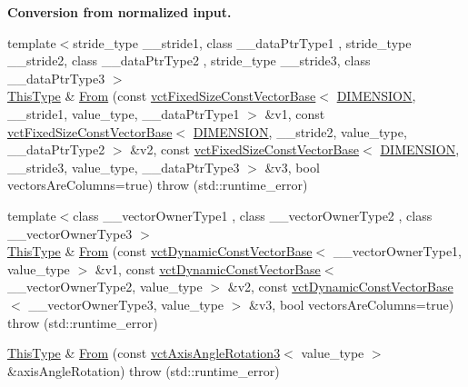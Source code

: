 \begin{Indent}{\bf Conversion from normalized input.}
\begin{DoxyCompactItemize}
{\footnotesize template$<$stride\-\_\-type \-\_\-\-\_\-stride1, class \-\_\-\-\_\-data\-Ptr\-Type1 , stride\-\_\-type \-\_\-\-\_\-stride2, class \-\_\-\-\_\-data\-Ptr\-Type2 , stride\-\_\-type \-\_\-\-\_\-stride3, class \-\_\-\-\_\-data\-Ptr\-Type3 $>$ }\\\hyperlink{classvct_matrix_rotation3_base_a027be766cb10ca3c2ad8e85c28ed0af9}{This\-Type} \& \hyperlink{classvct_matrix_rotation3_base_a4bd40779958850bf66165bbe2308d9da}{From} (const \hyperlink{classvct_fixed_size_const_vector_base}{vct\-Fixed\-Size\-Const\-Vector\-Base}$<$ \hyperlink{classvct_matrix_rotation3_base_a97514c086bdd3a691714817775b02f21a43f9b5ba9769ee62eadd8398853504cd}{D\-I\-M\-E\-N\-S\-I\-O\-N}, \-\_\-\-\_\-stride1, value\-\_\-type, \-\_\-\-\_\-data\-Ptr\-Type1 $>$ \&v1, const \hyperlink{classvct_fixed_size_const_vector_base}{vct\-Fixed\-Size\-Const\-Vector\-Base}$<$ \hyperlink{classvct_matrix_rotation3_base_a97514c086bdd3a691714817775b02f21a43f9b5ba9769ee62eadd8398853504cd}{D\-I\-M\-E\-N\-S\-I\-O\-N}, \-\_\-\-\_\-stride2, value\-\_\-type, \-\_\-\-\_\-data\-Ptr\-Type2 $>$ \&v2, const \hyperlink{classvct_fixed_size_const_vector_base}{vct\-Fixed\-Size\-Const\-Vector\-Base}$<$ \hyperlink{classvct_matrix_rotation3_base_a97514c086bdd3a691714817775b02f21a43f9b5ba9769ee62eadd8398853504cd}{D\-I\-M\-E\-N\-S\-I\-O\-N}, \-\_\-\-\_\-stride3, value\-\_\-type, \-\_\-\-\_\-data\-Ptr\-Type3 $>$ \&v3, bool vectors\-Are\-Columns=true)  throw (std\-::runtime\-\_\-error)
\item 
{\footnotesize template$<$class \-\_\-\-\_\-vector\-Owner\-Type1 , class \-\_\-\-\_\-vector\-Owner\-Type2 , class \-\_\-\-\_\-vector\-Owner\-Type3 $>$ }\\\hyperlink{classvct_matrix_rotation3_base_a027be766cb10ca3c2ad8e85c28ed0af9}{This\-Type} \& \hyperlink{classvct_matrix_rotation3_base_ac405493f34ee307de320ac3f1f394ae0}{From} (const \hyperlink{classvct_dynamic_const_vector_base}{vct\-Dynamic\-Const\-Vector\-Base}$<$ \-\_\-\-\_\-vector\-Owner\-Type1, value\-\_\-type $>$ \&v1, const \hyperlink{classvct_dynamic_const_vector_base}{vct\-Dynamic\-Const\-Vector\-Base}$<$ \-\_\-\-\_\-vector\-Owner\-Type2, value\-\_\-type $>$ \&v2, const \hyperlink{classvct_dynamic_const_vector_base}{vct\-Dynamic\-Const\-Vector\-Base}$<$ \-\_\-\-\_\-vector\-Owner\-Type3, value\-\_\-type $>$ \&v3, bool vectors\-Are\-Columns=true)  throw (std\-::runtime\-\_\-error)
\item 
\hyperlink{classvct_matrix_rotation3_base_a027be766cb10ca3c2ad8e85c28ed0af9}{This\-Type} \& \hyperlink{classvct_matrix_rotation3_base_ae6f3244fc3d07c3bc44db4e1da02f201}{From} (const \hyperlink{classvct_axis_angle_rotation3}{vct\-Axis\-Angle\-Rotation3}$<$ value\-\_\-type $>$ \&axis\-Angle\-Rotation)  throw (std\-::runtime\-\_\-error)

\end{DoxyCompactItemize}
\end{Indent}
